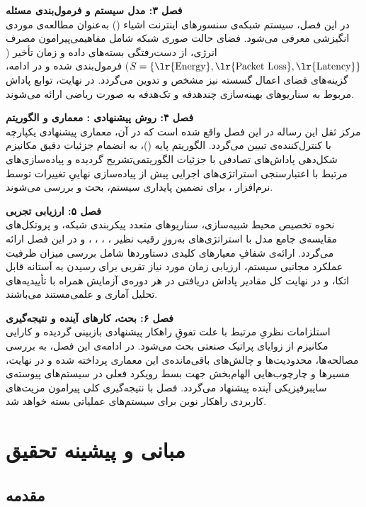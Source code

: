 \documentclass[oneside,openany,phd]{TMU-Thesis}
\begin{document}
\textbf{فصل ۳: مدل سیستم و فرمول‌بندی مسئله}\\
در این فصل، سیستم شبکه‌ی سنسورهای اینترنت اشیاء () به‌عنوان مطالعه‌ی موردی انگیزشی معرفی می‌شود. فضای حالت صوری شبکه شامل مفاهیمی‌پیرامون مصرف انرژی، از دست‌رفتگی بسته‌های داده و زمان تأخیر ($S = \{\text{\lr{Energy}}, \text{\lr{Packet Loss}}, \text{\lr{Latency}}\}$) فرمول‌بندی شده و در ادامه، گزینه‌های فضای اعمال گسسته نیز مشخص و تدوین می‌گردد. در نهایت، توابع پاداش مربوط به سناریوهای بهینه‌سازی چندهدفه و تک‌هدفه به صورت ریاضی ارائه می‌شوند.

\textbf{فصل ۴: روش پیشنهادی : معماری و الگوریتم}\\
مرکز ثقل این رساله در این فصل واقع شده است که در آن، معماری پیشنهادی یکپارچه با کنترل‌کننده‌ی  تبیین می‌گردد. الگوریتم پایه ()، به انضمام جزئیات دقیق مکانیزم شکل‌دهی پاداش‌های تصادفی با جزئیات الگوریتمی‌تشریح گردیده و پیاده‌سازی‌های مرتبط با اعتبارسنجی استراتژی‌های اجرایی پیش از پیاده‌سازی نهاییِ تغییرات توسط نرم‌افزار ، برای تضمین پایداری سیستم، بحث و بررسی می‌شوند.

\textbf{فصل ۵: ارزیابی تجربی}\\
نحوه تخصیص محیط شبیه‌سازی، سناریوهای متعدد پیکربندی شبکه، و پروتکل‌های مقایسه‌ی جامع مدل  با استراتژی‌های به‌روزِ رقیب نظیر ، ، ، ، و  در این فصل ارائه می‌گردد. ارائه‌ی شفافِ معیارهای کلیدی دستاوردها شامل بررسی میزان ظرفیت عملکرد مجانبی سیستم، ارزیابی زمان مورد نیاز تقربی برای رسیدن به آستانه قابل اتکا، و در نهایت کل مقادیر پاداش دریافتی در هر دوره‌ی آزمایش همراه با تأییدیه‌های تحلیل آماری و علمی‌مستند می‌باشند.

\textbf{فصل ۶: بحث، کارهای آینده و نتیجه‌گیری}\\
استلزامات نظریِ مرتبط با علت تفوقِ راهکار پیشنهادی بازبینی گردیده و کارایی مکانیزم از زوایای پراتیک صنعتی بحث می‌شود. در ادامه‌ی این فصل، به بررسی مصالحه‌ها، محدودیت‌ها و چالش‌های باقی‌مانده‌ی این معماری پرداخته شده و در نهایت، مسیرها و چارچوب‌هایی الهام‌بخش جهت بسط رویکرد فعلی در سیستم‌های پیوسته‌ی سایبرفیزیکی آینده پیشنهاد می‌گردد. فصل با نتیجه‌گیری کلی پیرامون مزیت‌های کاربردی راهکار نوین برای سیستم‌های عملیاتی بسته خواهد شد.

\newpage

\chapter{مبانی و پیشینه تحقیق}
\section{مقدمه}
\end{document}
